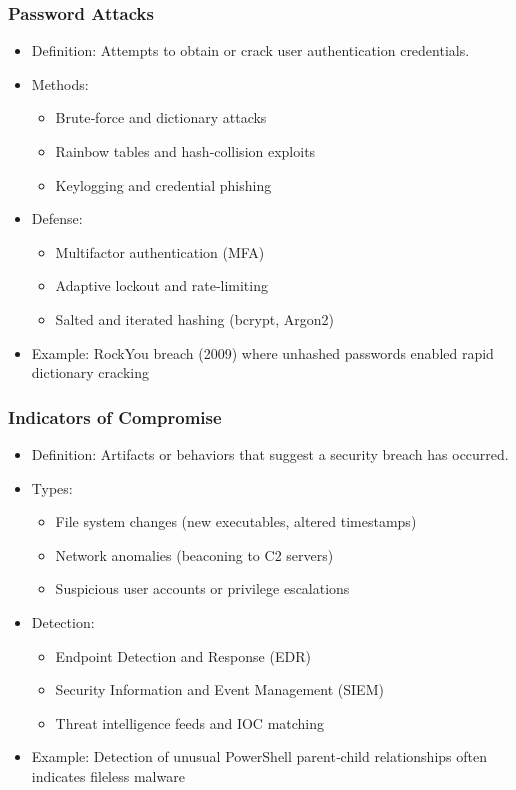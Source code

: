 \documentclass[11pt]{article}
\begin{document}
\subsubsection{Password Attacks}
\label{sec:org4d25bd8}
\begin{itemize}
\item Definition: Attempts to obtain or crack user authentication credentials.
\item Methods:
\begin{itemize}
\item Brute‑force and dictionary attacks
\item Rainbow tables and hash‑collision exploits
\item Keylogging and credential phishing
\end{itemize}
\item Defense:
\begin{itemize}
\item Multifactor authentication (MFA)
\item Adaptive lockout and rate‑limiting
\item Salted and iterated hashing (bcrypt, Argon2)
\end{itemize}
\item Example: RockYou breach (2009) where unhashed passwords enabled rapid dictionary cracking
\end{itemize}
\subsubsection{Indicators of Compromise}
\label{sec:org466e49c}
\begin{itemize}
\item Definition: Artifacts or behaviors that suggest a security breach has occurred.
\item Types:
\begin{itemize}
\item File system changes (new executables, altered timestamps)
\item Network anomalies (beaconing to C2 servers)
\item Suspicious user accounts or privilege escalations
\end{itemize}
\item Detection:
\begin{itemize}
\item Endpoint Detection and Response (EDR)
\item Security Information and Event Management (SIEM)
\item Threat intelligence feeds and IOC matching
\end{itemize}
\item Example: Detection of unusual PowerShell parent‑child relationships often indicates fileless malware
\end{itemize}
\end{document}
